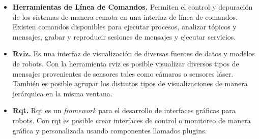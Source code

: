         \begin{itemize}
            \item \textbf{Herramientas de Línea de Comandos.} Permiten el control y depuración de los sistemas 
            de manera remota en una interfaz de línea de comandos. Existen comandos disponibles para ejecutar procesos, 
            analizar tópicos y mensajes, grabar y reproducir sesiones de mensajes y ejecutar servicios.

            \item \textbf{Rviz.} Es una interfaz de visualización de diversas fuentes de datos y modelos de robots. 
            Con la herramienta rviz es posible visualizar diversos tipos de mensajes provenientes de sensores tales 
            como cámaras o sensores láser. También es posible agrupar los distintos tipos de visualizaciones de manera 
            jerárquica en la misma ventana.

            \item \textbf{Rqt.} Rqt es un \textit{framework} para el desarrollo de interfaces gráficas para robots. 
            Con rqt es posible crear interfaces de control o monitoreo de manera gráfica y personalizada usando 
            componentes llamados plugins.

        \end{itemize}


